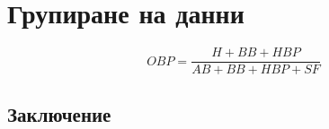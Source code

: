 \newpage
\chapter{Групиране на данни}
\label{chapter06}

\begin{equation}
OBP = \frac{H + BB + HBP}{AB + BB + HBP + SF}
\label{equation0001}
\end{equation}

\section*{Заключение}
